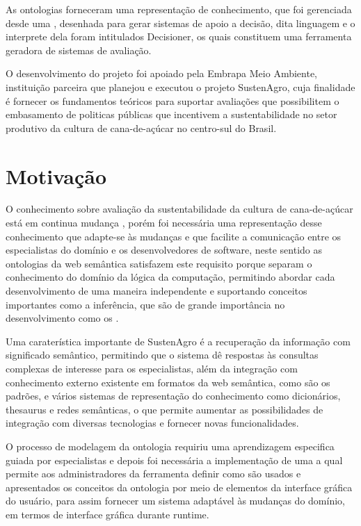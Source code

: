 As ontologias forneceram uma representação de conhecimento, que foi
gerenciada desde uma ,
desenhada para gerar sistemas de apoio a decisão, dita linguagem e
o interprete dela foram intitulados Decisioner, os quais constituem
uma ferramenta geradora de sistemas de avaliação.

O desenvolvimento do projeto foi apoiado pela Embrapa
Meio Ambiente, instituição parceira que planejou e executou o projeto
SustenAgro, cuja finalidade é fornecer os fundamentos teóricos para
suportar avaliações que possibilitem o embasamento de politicas públicas
que incentivem a sustentabilidade no setor produtivo da cultura de
cana-de-açúcar no centro-sul do Brasil.

\section{Motivação}

O conhecimento sobre avaliação da sustentabilidade da cultura de cana-de-açúcar
está em continua mudança \citep{oliveira:2013}, porém foi necessária
uma representação desse conhecimento que adapte-se às mudanças e que
facilite a comunicação entre os especialistas do domínio e os desenvolvedores
de software, neste sentido as ontologias da web semântica satisfazem
este requisito porque separam o conhecimento do domínio da lógica
da computação, permitindo abordar cada desenvolvimento de uma maneira
independente e suportando conceitos importantes como a inferência,
que são de grande importância no desenvolvimento como os .

Uma caraterística importante de SustenAgro é a recuperação da informação
com significado semântico, permitindo que o sistema dê respostas às
consultas complexas de interesse para os especialistas, além da integração
com conhecimento externo existente em formatos da web semântica, como
são os padrões,
 e vários sistemas de representação
do conhecimento como dicionários, thesaurus e redes semânticas, o
que permite aumentar as possibilidades de integração com diversas
tecnologias e fornecer novas funcionalidades. 

O processo de modelagem da ontologia requiriu uma aprendizagem especifica
guiada por especialistas e depois foi necessária a implementação de
uma a qual permite aos
administradores da ferramenta definir como são usados e apresentados
os conceitos da ontologia por meio de elementos da interface gráfica
do usuário, para assim fornecer um sistema adaptável às mudanças do
domínio, em termos de interface gráfica durante runtime.

